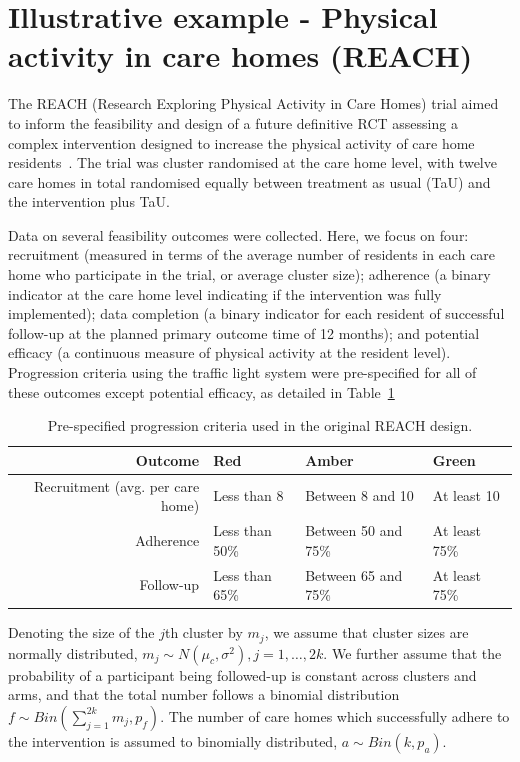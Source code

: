 \documentclass[AMA,STIX1COL]{WileyNJD-v2}
\begin{document}
\section{Illustrative example - Physical activity in care homes (REACH)}\label{sec:REACH}

The REACH (Research Exploring Physical Activity in Care Homes) trial aimed to inform the feasibility and design of a future definitive RCT assessing a complex intervention designed to increase the physical activity of care home residents~\cite{Forster2017}. The trial was cluster randomised at the care home level, with twelve care homes in total randomised equally between treatment as usual (TaU) and the intervention plus TaU.

Data on several feasibility outcomes were collected. Here, we focus on four: recruitment (measured in terms of the average number of residents in each care home who participate in the trial, or average cluster size); adherence (a binary indicator at the care home level indicating if the intervention was fully implemented); data completion (a binary indicator for each resident of successful follow-up at the planned primary outcome time of 12 months); and potential efficacy (a continuous measure of physical activity at the resident level). Progression criteria using the traffic light system were pre-specified for all of these outcomes except potential efficacy, as detailed in Table~\ref{tab:pcs}

\begin{table}
\caption{Pre-specified progression criteria used in the original REACH design.}
\centering
\begin{tabular}{r l l l}
\toprule
Outcome & Red & Amber & Green \\
\midrule
Recruitment (avg. per care home) & Less than 8 & Between 8 and 10 & At least 10 \\
Adherence & Less than 50\% & Between 50 and 75\% & At least 75\% \\
Follow-up & Less than 65\% & Between 65 and 75\% & At least 75\% \\
\bottomrule
\end{tabular}
\label{tab:pcs}
\end{table}

Denoting the size of the $j$th cluster by $m_j$, we assume that cluster sizes are normally distributed, $m_j \sim N(\mu_c, \sigma^2), j = 1, \ldots , 2k$. We further assume that the probability of a participant being followed-up is constant across clusters and arms, and that the total number follows a binomial distribution $f \sim Bin(\sum_{j=1}^{2k} m_j, p_f)$. The number of care homes which successfully adhere to the intervention is assumed to binomially distributed, $a \sim Bin(k, p_a)$.
\end{document}
